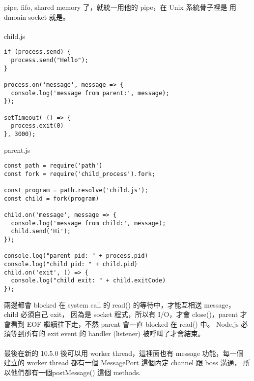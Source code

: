   pipe, fifo, shared memory 了，就統一用他的 pipe，在 Unix 系統骨子裡是
  用 dmoain socket 就是。
  \\\\
  child.js
  \begin{verbatim}
if (process.send) {
  process.send("Hello");
}

process.on('message', message => {
  console.log('message from parent:', message);
});

setTimeout( () => {
  process.exit(0)
}, 3000);
  \end{verbatim}
  parent.js
  \begin{verbatim}
const path = require('path')
const fork = require('child_process').fork;

const program = path.resolve('child.js');
const child = fork(program)

child.on('message', message => {
  console.log('message from child:', message);
  child.send('Hi');
});

console.log("parent pid: " + process.pid)
console.log("child pid: " + child.pid)
child.on('exit', () => {
  console.log("child exit: " + child.exitCode)
});
  \end{verbatim}
  兩邊都會 blocked 在 system call 的 read() 的等待中，才能互相送 message，
  child 必須自己 exit， 因為是 socket 程式，所以有 I/O，才會 close()，parent
  才會看到 EOF 繼續往下走，不然 parent 會一直 blocked 在 read() 中。
  Node.js 必須等到所有的 exit event 的 handler (listener) 被呼叫了才會結束。
  \\\\
  最後在新的 10.5.0 後可以用 worker thread，這裡面也有 message 功能，每一個
  建立的 worker thread 都有一個 MessagePort 這個內定 channel 跟 boss 溝通，
  所以他們都有一個postMessage() 這個 methods.

